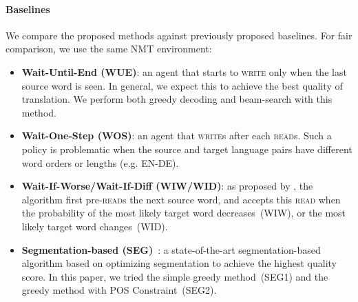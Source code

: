\paragraph{Baselines} We compare the proposed methods against previously proposed baselines.
For fair comparison, we use the same NMT environment:
\begin{itemize}

\item \textbf{Wait-Until-End (WUE)}: an agent that starts to \textsc{write} only when the last source word is seen. In general, we expect this to achieve the best quality of translation. We perform both greedy decoding and beam-search with this method.

\item \textbf{Wait-One-Step (WOS)}: an agent that \textsc{write}s after each \textsc{read}s. %
Such a policy is problematic when the source and target language pairs have different word orders or lengths (e.g. EN-DE). %

\item \textbf{Wait-If-Worse/Wait-If-Diff (WIW/WID)}: as proposed by \citep{cho2016can}, the algorithm first pre-\textsc{read}s the next source word, and accepts this \textsc{read} when the probability of the most likely target word decreases~(WIW), or the most likely target word changes~(WID). 

\item \textbf{Segmentation-based (SEG)}~\cite{oda-EtAl:2014:P14-2}: a state-of-the-art segmentation-based algorithm based on optimizing segmentation to achieve the highest quality score. In this paper, we tried the simple greedy method~(SEG1) and the greedy method with POS Constraint~(SEG2).
\end{itemize}

